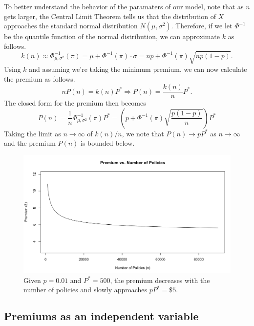 \documentclass[12pt]{article}
\begin{document}
To better understand the behavior of the paramaters of our model, note that as $n$ gets larger, the Central Limit Theorem tells us that the distribution of $X$ approaches the standard normal distribution $N(\mu, \sigma^2)$. Therefore, if we let $\Phi^{-1}$ be the quantile function of the normal distribution, we can approximate $k$ as follows.
\begin{equation}
  \label{k}
  k(n) \approx \Phi^{-1}_{\mu,\sigma^2}(\pi) = \mu + \Phi^{-1}(\pi)\cdot \sigma = np + \Phi^{-1}(\pi)\sqrt{np(1-p)}.
\end{equation}
Using $k$ and assuming we're taking the minimum premium, we can now calculate the premium as follows.
\begin{equation}
  \label{premiumpi}
  nP(n) = k(n)P^* \Longrightarrow P(n) = \frac{k(n)}{n}P^*.
\end{equation}
\noindent The closed form for the premium then becomes
\begin{equation*}
    P(n) = \frac{1}{n}\Phi^{-1}_{\mu,\sigma^2}(\pi)P^* = \left(p + \Phi^{-1}(\pi)\sqrt{\frac{p(1-p)}{n}}\right)P^*
\end{equation*}
Taking the limit as $n\to\infty$ of $k(n)/n$, we note that $P(n) \to pP^*$ as $n\to\infty$ and the premium $P(n)$ is bounded below.

\begin{figure}[H]
    \begin{center}
        \includegraphics[scale=.35]{premium}
    \end{center}
    \caption{\footnotesize Given $p=0.01$ and $P^*=500$, the premium decreases with the number of policies and slowly approaches $pP^*=\$5$.}\label{fig1}
\end{figure}

\subsection{Premiums as an independent variable}
\end{document}
